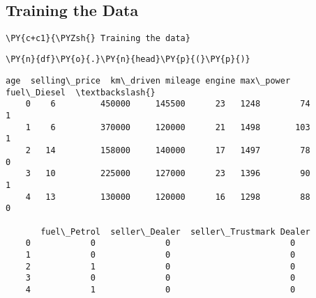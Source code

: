         \begin{center}
        \end{center}
        { \hspace*{\fill} \\}
        
\subsection*{Training the Data}

     \lipsum[1-1]

    \begin{tcolorbox}[breakable, size=fbox, boxrule=1pt, pad at break*=1mm,colback=cellbackground, colframe=cellborder]
    \begin{Verbatim}[commandchars=\\\{\}]
    \PY{c+c1}{\PYZsh{} Training the data}
    \end{Verbatim}
    \end{tcolorbox}
    
        \begin{tcolorbox}[breakable, size=fbox, boxrule=1pt, pad at break*=1mm,colback=cellbackground, colframe=cellborder]
    \begin{Verbatim}[commandchars=\\\{\}]
    \PY{n}{df}\PY{o}{.}\PY{n}{head}\PY{p}{(}\PY{p}{)}
    \end{Verbatim}
    \end{tcolorbox}
    
                \begin{tcolorbox}[breakable, size=fbox, boxrule=.5pt, pad at break*=1mm, opacityfill=0]
    \begin{Verbatim}[commandchars=\\\{\}]
       age  selling\_price  km\_driven mileage engine max\_power  fuel\_Diesel  \textbackslash{}
    0    6         450000     145500      23   1248        74            1
    1    6         370000     120000      21   1498       103            1
    2   14         158000     140000      17   1497        78            0
    3   10         225000     127000      23   1396        90            1
    4   13         130000     120000      16   1298        88            0
    
       fuel\_Petrol  seller\_Dealer  seller\_Trustmark Dealer
    0            0              0                        0
    1            0              0                        0
    2            1              0                        0
    3            0              0                        0
    4            1              0                        0
    \end{Verbatim}
    \end{tcolorbox}
            

